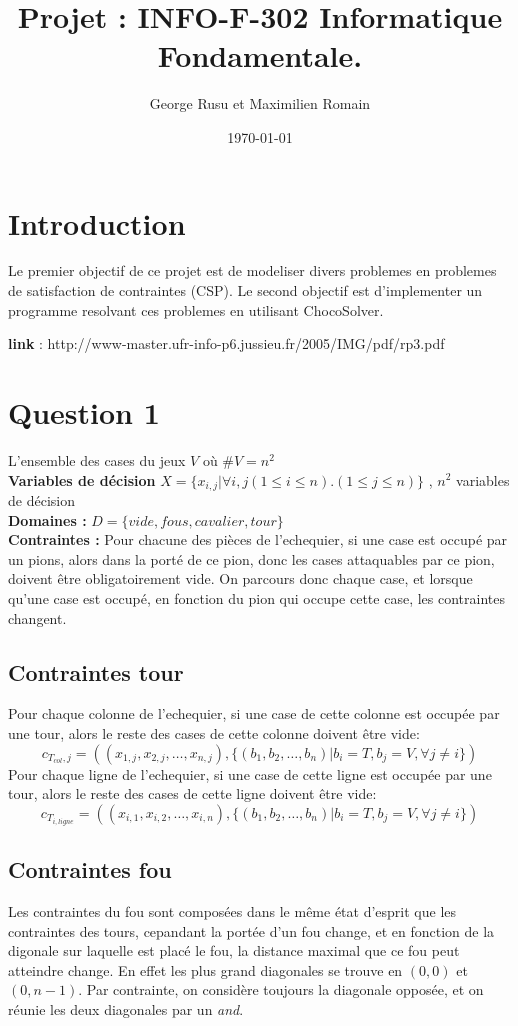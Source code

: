 \documentclass[a4paper,10pt]{article}
\title{Projet : INFO-F-302 Informatique Fondamentale.}
\author{George Rusu et Maximilien Romain}
\date{\today}
\begin{document}
\maketitle
\tableofcontents
\newpage
\section{Introduction}
Le premier objectif de ce projet est de modeliser divers problemes en problemes de satisfaction de contraintes (CSP). Le second objectif est d’implementer un programme resolvant ces problemes en utilisant ChocoSolver.

\textbf{link} :  http://www-master.ufr-info-p6.jussieu.fr/2005/IMG/pdf/rp3.pdf

\section{Question 1}
L'ensemble des cases du jeux $V$ où $ \#V = n^2$ \\
\textbf {Variables de décision} $ X = \{x_{i,j} | \forall i,j (1 \leq i \leq n).(1 \leq j \leq n)\}$ , $n^2$ variables de décision \\
\textbf{Domaines : } $ D = \{vide, fous, cavalier, tour\} $\\
\textbf{Contraintes : } Pour chacune des pièces de l'echequier, si une case est occupé par un pions, alors dans la porté de ce pion, donc les cases attaquables par ce pion, doivent être obligatoirement vide.  On parcours donc chaque case, et lorsque qu'une case est occupé, en fonction du pion qui occupe cette case, les contraintes changent.


\subsection{Contraintes tour}
	Pour chaque colonne de l'echequier, si une case de cette colonne est occupée par une tour, alors le reste des cases de cette colonne doivent être vide:
$$ c_{T_{col},j} = ((x_{1,j}, x_{2,j},\ldots, x_{n,j}), \{(b_1, b_2,\ldots, b_n) | b_i = T, b_j = V, \forall j \ne i\})$$
	Pour chaque ligne de l'echequier, si une case de cette ligne est occupée par une tour, alors le reste des cases de cette ligne doivent être vide:
$$ c_{T_{i,ligne}} = ((x_{i,1}, x_{i,2},\ldots, x_{i,n}), \{(b_1, b_2,\ldots, b_n) | b_i = T, b_j = V, \forall j \ne i\})$$

\subsection{Contraintes fou}
	Les contraintes du fou sont composées dans le même état d'esprit que les contraintes des tours, cepandant la portée d'un fou change, et en fonction de la digonale sur laquelle est placé le fou, la distance maximal que ce fou peut atteindre change.  En effet les plus grand diagonales se trouve en $(0,0)$ et $(0,n-1)$.
	Par contrainte, on considère toujours la diagonale opposée, et on réunie les deux diagonales par un \emph{and}.
\end{document}
